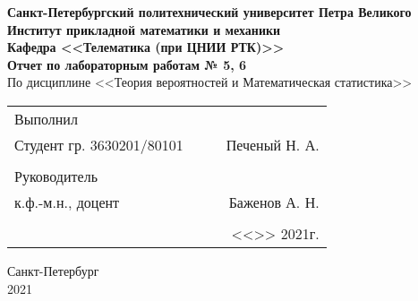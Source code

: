 \documentclass[12pt]{article}
\begin{document}
\begin{titlepage}
	\begin{center}
		\hfill \break
		{\textbf{Санкт-Петербургский политехнический университет Петра Великого}}\\
		\hfill \break
		\textbf{Институт прикладной математики и механики}\\
		\hfill \break
		\textbf{Кафедра <<Телематика (при ЦНИИ РТК)>>}\\
		\vfill
		\large{\bfseries Отчет по лабораторным работам № 5, 6}\\
		\hfill \break
		\hfill \break
		\hfill \break
		\hfill \break
		По дисциплине <<Теория вероятностей и Математическая статистика>>\\
		\hfill \break
		\hfill \break
		\hfill \break
	\end{center}
 
	\normalsize
	{ 
		\begin{tabular}{lp{2cm}cr}
			Выполнил &&&\\
			Студент гр. 3630201/80101&&\underline{\hspace{1.5cm}}& Печеный Н. А.\\\\
			Руководитель&&&\\ 
			к.ф.-м.н., доцент && \underline{\hspace{1.5cm}}& Баженов А. Н. \\\\
			&&&<<\underline{\phantom{333}}>>\underline{\phantom{сентября000}}
			2021г.
		\end{tabular}
	}
\vfill

\begin{center} Санкт-Петербург \\2021 \end{center}
\end{titlepage}

\newpage

\setcounter{page}{2}

\setlength{\parindent}{1cm}

\tableofcontents

\newpage

\listoffigures

\newpage

\listoftables

\newpage
\end{document}
